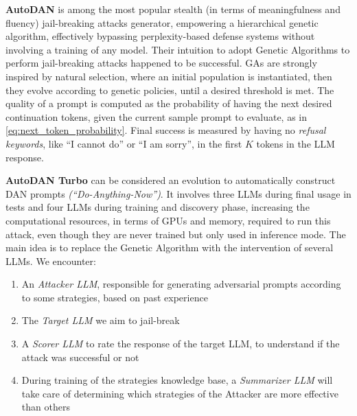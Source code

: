 \documentclass[../thesis]{subfiles}
\begin{document}
\textbf{AutoDAN} \citep{liu2024autodangeneratingstealthyjailbreak}
is among the most popular stealth (in terms of meaningfulness and fluency) jail-breaking attacks generator,
empowering a hierarchical genetic algorithm,
effectively bypassing perplexity-based defense systems
without involving a training of any model.
Their intuition to adopt Genetic Algorithms to perform jail-breaking attacks happened to be successful. GAs are strongly inspired by natural selection, where an initial population is instantiated, then they evolve according to genetic policies, until a desired threshold is met.
The quality of a prompt is computed as the probability of having the next desired continuation tokens, given the current sample prompt to evaluate, as in \cref{eq:next_token_probability}.
Final success is measured by having no \emph{refusal keywords}, like ``I cannot do'' or ``I am sorry'', in the first $K$ tokens in the LLM response.

\textbf{AutoDAN Turbo} \citep{liu2025autodanturbo} can be considered an evolution to automatically construct DAN prompts \emph{(``Do-Anything-Now'')}. It involves three LLMs during final usage in tests and four LLMs during training and discovery phase, increasing the computational resources, in terms of GPUs and memory, required to run this attack, even though they are never trained but only used in inference mode.
The main idea is to replace the Genetic Algorithm with the intervention of several LLMs.
We encounter:
\begin{enumerate}
    \item An \emph{Attacker LLM}, responsible for generating adversarial prompts according to some strategies, based on past experience
    \item The \emph{Target LLM} we aim to jail-break
    \item A \emph{Scorer LLM} to rate the response of the target LLM, to understand if the attack was successful or not
    \item During training of the strategies knowledge base, a \emph{Summarizer LLM} will take care of determining which strategies of the Attacker are more effective than others
\end{enumerate}
\end{document}
